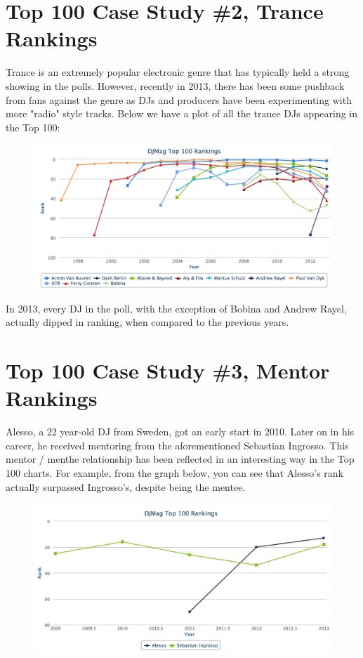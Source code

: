 \documentclass[12pt]{dalcsthesis}
\begin{document}
\section{Top 100 Case Study \#2, Trance Rankings}

Trance is an extremely popular electronic genre that has typically held a strong showing in the polls. However, recently in 2013, there has been some pushback from fans against the genre as DJs and producers have been experimenting with more "radio" style tracks. Below we have a plot of all the trance DJs appearing in the Top 100:

\begin{figure}[h]
\includegraphics[scale=.4]{trance_graph}
\centering
\end{figure}

In 2013, every DJ in the poll, with the exception of Bobina and Andrew Rayel, actually dipped in ranking, when compared to the previous years.

\section{Top 100 Case Study \#3, Mentor Rankings}

Alesso, a 22 year-old DJ from Sweden, got an early start in 2010. Later on in his career, he received mentoring from the aforementioned Sebastian Ingrosso. This mentor / menthe relationship has been reflected in an interesting way in the Top 100 charts. For example, from the graph below, you can see that Alesso's rank actually surpassed Ingrosso's, despite being the mentee.

\begin{figure}[h]
\includegraphics[scale=.65]{alesso_seb_graph}
\centering
\end{figure}
\end{document}
